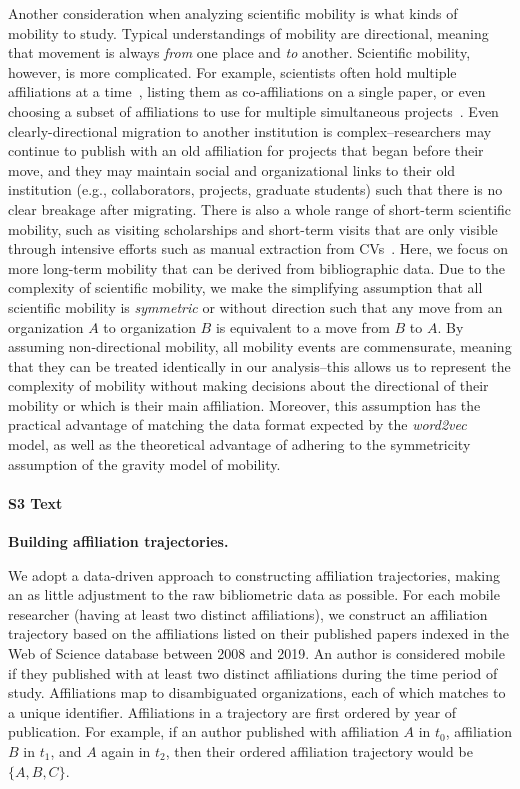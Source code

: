 \documentclass[12pt]{article} %
\begin{document}
Another consideration when analyzing scientific mobility is what kinds of mobility to study. 
Typical understandings of mobility are directional, meaning that movement is always \textit{from} one place and \textit{to} another. 
Scientific mobility, however, is more complicated.
For example, scientists often hold multiple affiliations at a time~\autocite{markova2016synchronous}, listing them as co-affiliations on a single paper, or even choosing a subset of affiliations to use for multiple simultaneous projects~\autocite{robinson2019mobility}.
Even clearly-directional migration to another institution is complex--researchers may continue to publish with an old affiliation for projects that began before their move, and they may maintain social and organizational links to their old institution (e.g., collaborators, projects, graduate students) such that there is no clear breakage after migrating. 
There is also a whole range of short-term scientific mobility, such as visiting scholarships and short-term visits that are only visible through intensive efforts such as manual extraction from CVs~\autocite{woolley2009cv, sandstrom2009cv, canibano2011temporary}.
Here, we focus on more long-term mobility that can be derived from bibliographic data. 
Due to the complexity of scientific mobility, we make the simplifying assumption that all scientific mobility is \textit{symmetric} or without direction such that any move from an organization $A$ to organization $B$ is equivalent to a move from $B$ to $A$. 
By assuming non-directional mobility, all mobility events are commensurate, meaning that they can be treated identically in our analysis--this allows us to represent the complexity of mobility without making decisions about the directional of their mobility or which is their main affiliation.
Moreover, this assumption has the practical advantage of matching the data format expected by the \textit{word2vec} model, as well as the theoretical advantage of adhering to the symmetricity assumption of the gravity model of mobility. 



%
\paragraph*{S3 Text}
\label{si:text:mobility_traj}
{\bf Building affiliation trajectories.}

We adopt a data-driven approach to constructing affiliation trajectories, making an as little adjustment to the raw bibliometric data as possible. 
For each mobile researcher (having at least two distinct affiliations), we construct an affiliation trajectory based on the affiliations listed on their published papers indexed in the Web of Science database between 2008 and 2019. 
An author is considered mobile if they published with at least two distinct affiliations during the time period of study. 
Affiliations map to disambiguated organizations, each of which matches to a unique identifier. 
Affiliations in a trajectory are first ordered by year of publication.
For example, if an author published with affiliation $A$ in $t_{0}$, affiliation $B$ in $t_{1}$, and $A$ again in $t_{2}$, then their ordered affiliation trajectory would be $\{A, B, C\}$. 
\end{document}
